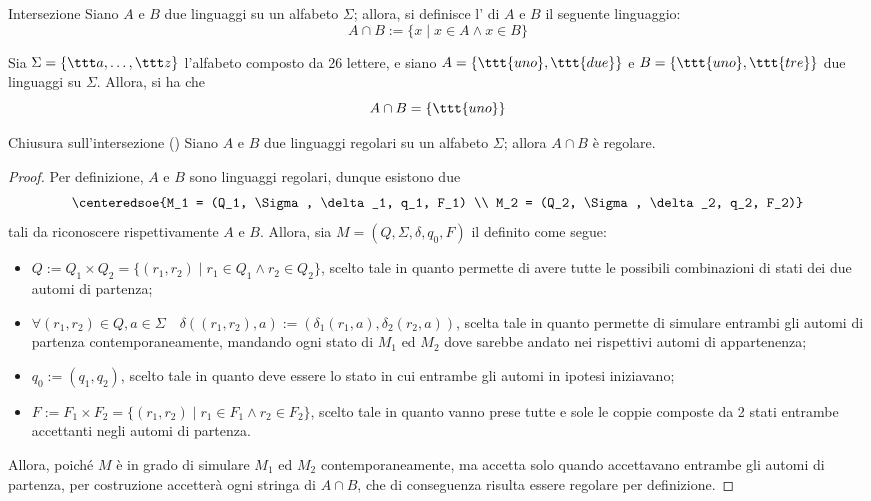 \documentclass[a4paper, 12pt]{report}
\begin{document}
    \begin{frameddefn}{Intersezione}
        Siano $A$ e $B$ due linguaggi su un alfabeto $\Sigma$; allora, si definisce l' di $A$ e $B$ il seguente linguaggio: $$A \cap B := \{x \mid x \in A \land x \in B \}$$
    \end{frameddefn}

    \begin{example}[Intersezione]
        Sia $\Sigma = \{\ttt a , \ldots, \ttt z\}$ l'alfabeto composto da 26 lettere, e siano $A = \{\ttt{uno}, \ttt{due}\}$ e $B = \{\ttt{uno}, \ttt{tre}\}$ due linguaggi su $\Sigma$. Allora, si ha che $$A \cap B = \{\ttt{uno}\}$$
    \end{example}

    \begin{framedprop}[label={closure inters}]{Chiusura sull'intersezione (\REG)}
        Siano $A$ e $B$ due linguaggi regolari su un alfabeto $\Sigma$; allora $A \cap B$ è regolare.
    \end{framedprop}

    \begin{proof}
        Per definizione, $A$ e $B$ sono linguaggi regolari, dunque esistono due \DFA $$\centeredsoe{M_1 = (Q_1, \Sigma, \delta_1, q_1, F_1) \\ M_2 = (Q_2, \Sigma, \delta_2, q_2, F_2)}$$ tali da riconoscere rispettivamente $A$ e $B$. Allora, sia $M = (Q, \Sigma, \delta, q_0, F)$ il \DFA definito come segue:

        \begin{itemize}
            \item $Q := Q_1 \times Q_2 = \{(r_1, r_2) \mid r_1 \in Q_1 \land r_2 \in Q_2\}$, scelto tale in quanto permette di avere tutte le possibili combinazioni di stati dei due automi di partenza;
            \item $\forall (r_1, r_2) \in Q, a \in \Sigma \quad \delta((r_1, r_2), a) := (\delta_1(r_1, a), \delta_2(r_2, a))$, scelta tale in quanto permette di simulare entrambi gli automi di partenza contemporaneamente, mandando ogni stato di $M_1$ ed $M_2$ dove sarebbe andato nei rispettivi automi di appartenenza;
            \item $q_0 := (q_1, q_2)$, scelto tale in quanto deve essere lo stato in cui entrambe gli automi in ipotesi iniziavano;
            \item $F:= F_1 \times F_2 = \{(r_1, r_2) \mid r_1 \in F_1 \land r_2 \in F_2\}$, scelto tale in quanto vanno prese tutte e sole le coppie composte da 2 stati entrambe accettanti negli automi di partenza.
        \end{itemize}

        Allora, poiché $M$ è in grado di simulare $M_1$ ed $M_2$ contemporaneamente, ma accetta solo quando accettavano entrambe gli automi di partenza, per costruzione accetterà ogni stringa di $A \cap B$, che di conseguenza risulta essere regolare per definizione.
    \end{proof}
\end{document}
